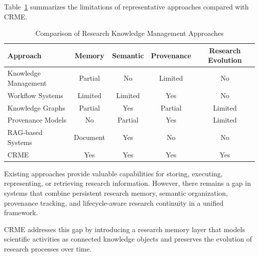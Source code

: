 Table~\ref{tab:related_work_comparison} summarizes the limitations of
representative approaches compared with CRME.

\begin{table}[t]
\caption{Comparison of Research Knowledge Management Approaches}
\label{tab:related_work_comparison}

\centering
\small

\begin{tabular}{lcccc}
\toprule
Approach &
Memory &
Semantic &
Provenance &
Research Evolution
\\
\midrule

Knowledge Management &
Partial &
No &
Limited &
No
\\

Workflow Systems &
Limited &
Limited &
Yes &
No
\\

Knowledge Graphs &
Partial &
Yes &
Partial &
Limited
\\

Provenance Models &
No &
Partial &
Yes &
Limited
\\

RAG-based Systems &
Document &
Yes &
No &
No
\\

CRME &
Yes &
Yes &
Yes &
Yes
\\

\bottomrule
\end{tabular}

\end{table}


Existing approaches provide valuable capabilities for storing,
executing, representing, or retrieving research information. However,
there remains a gap in systems that combine persistent research memory,
semantic organization, provenance tracking, and lifecycle-aware research
continuity in a unified framework.

CRME addresses this gap by introducing a research memory layer that
models scientific activities as connected knowledge objects and preserves
the evolution of research processes over time.



